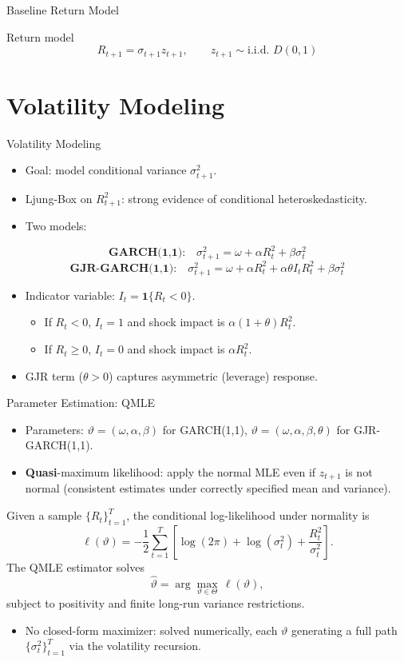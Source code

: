 \documentclass[aspectratio=169,11pt]{beamer}
\begin{document}
\begin{frame}{Baseline Return Model}
\begin{block}{Return model}
\[
R_{t+1}=\sigma_{t+1}z_{t+1}, \qquad z_{t+1}\sim \text{i.i.d. }D(0,1)
\]
\end{block}
\end{frame}

\section{Volatility Modeling}
\begin{frame}{Volatility Modeling}
\begin{itemize}
\item Goal: model conditional variance \(\sigma_{t+1}^2\).
\item Ljung-Box on \(R_{t+1}^2\): strong evidence of conditional heteroskedasticity.
\item Two models:
\end{itemize}
\[
\textbf{GARCH(1,1):}\quad
\sigma^2_{t+1} = \omega + \alpha R_t^2 + \beta \sigma_t^2
\]
\[
\textbf{GJR-GARCH(1,1):}\quad
\sigma^2_{t+1} = \omega + \alpha R_t^2 + \alpha\theta I_tR_t^2 + \beta \sigma_t^2
\]
\begin{itemize}
\item Indicator variable: \(I_t=\mathbf{1}\{R_t<0\}\).
\begin{itemize}
\item If \(R_t<0\), \(I_t=1\) and shock impact is \(\alpha(1+\theta)R_t^2\).
\item If \(R_t\ge 0\), \(I_t=0\) and shock impact is \(\alpha R_t^2\).
\end{itemize}
\item GJR term (\(\theta>0\)) captures asymmetric (leverage) response.
\end{itemize}
\end{frame}

\begin{frame}{Parameter Estimation: QMLE}
\small
\begin{itemize}
\item Parameters: \(\vartheta=(\omega,\alpha,\beta)\) for GARCH(1,1), \(\vartheta=(\omega,\alpha,\beta,\theta)\) for GJR-GARCH(1,1).
\item \textbf{Quasi}-maximum likelihood: apply the normal MLE even if \(z_{t+1}\) is not normal (consistent estimates under correctly specified mean and variance).
\end{itemize}
Given a sample \(\{R_t\}_{t=1}^T\), the conditional log-likelihood under normality is
\[
\ell(\vartheta)
=-\frac{1}{2}\sum_{t=1}^T
\left[\log(2\pi)+\log(\sigma_t^2)+\frac{R_t^2}{\sigma_t^2}\right].
\]
The QMLE estimator solves
\[
\hat{\vartheta}=\arg\max_{\vartheta\in\Theta}\,\ell(\vartheta),
\]
subject to positivity and finite long-run variance restrictions.
\begin{itemize}
\item No closed-form maximizer: solved numerically, each \(\vartheta\) generating a full path \(\{\sigma_t^2\}_{t=1}^T\) via the volatility recursion.
\end{itemize}
\end{frame}
\end{document}
